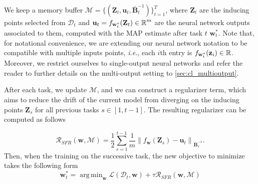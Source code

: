 \documentclass{article}
\makeatletter
\newcommand{\ie}{\textit{i.e.\@}\xspace}
\newcommand{\dataset}{\ensuremath{\mathcal{D}}}
\newcommand{\weights}{\ensuremath{\mathbf{w}}}
\newcommand{\mbf}[1]{\mathbf{#1}}
\newcommand{\MB}{\mbf{B}}
\newcommand{\MZ}{\mbf{Z}}
\newcommand{\T}{\top}
\newcommand{\vz}{\mbf{z}}
\newcommand{\vu}{\mbf{u}}
\newcommand{\vw}{\mbf{w}}
\DeclareMathOperator*{\argmin}{arg\,min}
\makeatother
\begin{document}
We keep a memory buffer $\mathcal{M} = \{(\MZ_t, \vu_t, \bar{\MB}^{-1}_t)\}_{t=1}^T$, where $\MZ_t$ are the inducing points selected from $\dataset_t$ and  $\vu_t = f_{\vw_t^*}(\MZ_t)\in \R^{m}$ are the neural network outputs associated to them, computed with the MAP estimate after task $t$ $\weights_t^*$. Note that, for notational convenience, we are extending our neural network notation to be compatible with multiple inputs points, \ie, each $i$th entry is $f_{\weights_t^*}(\vz_i)\in \R$. Moreover, we restrict ourselves to single-output neural networks and refer the reader to further details on the multi-output setting to \cref{sec:cl_multioutput}. 

After each task, we update $\mathcal{M}$, and we can construct a regularizer term, which aims to reduce the drift of the current model from diverging on the inducing points $\MZ_s$ for all previous tasks $ s \in \left[ 1, t-1 \right]$. The resulting regularizer can be computed as follows

\begin{equation}
	\mathcal{R}_\textit{SFR}(\weights, \mathcal{M}) = \frac{1}{2} \sum_{s=1}^{t-1} \frac{1}{m} 
	\left\lVert 
	f_{\weights}(\MZ_{s}) - \vu_t %
	\right\rVert_{\bar{\MB}^{-1}_{s}}.
\end{equation}
Then, when the training on the successive task, the new objective to minimize takes the following form
\begin{equation}
	\weights_t^* = \argmin_{\weights} \mathcal{L}(\mathcal{D}_t, \weights) + \tau \mathcal{R}_\textit{SFR}(\weights, \mathcal{M})
\end{equation}
\end{document}
